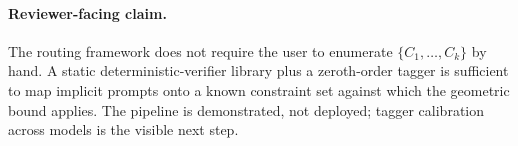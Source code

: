 \documentclass{article}
\theoremstyle{plain}
\theoremstyle{definition}
\theoremstyle{remark}
\begin{document}
\paragraph{Reviewer-facing claim.} The routing framework does not require the user to enumerate $\{C_1, \ldots, C_k\}$ by hand. A static deterministic-verifier library plus a zeroth-order tagger is sufficient to map implicit prompts onto a known constraint set against which the geometric bound applies. The pipeline is demonstrated, not deployed; tagger calibration across models is the visible next step.



\newpage

\end{document}

